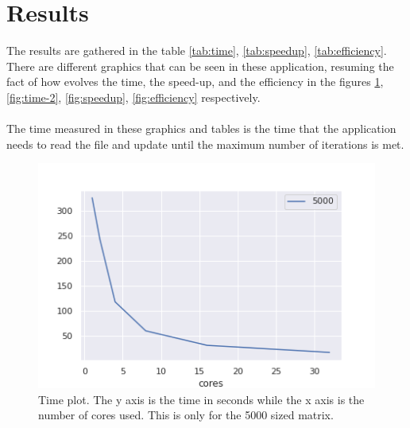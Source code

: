 \documentclass[11pt, a4paper]{article}
\begin{document}
	\section{Results}
		The results are gathered in the table \ref{tab:time}, \ref{tab:speedup}, \ref{tab:efficiency}. There are different graphics that can be seen in these application,  resuming the fact of how evolves the time, the speed-up, and the efficiency in the figures \ref{fig:time-1}, \ref{fig:time-2}, \ref{fig:speedup}, \ref{fig:efficiency} respectively.\\
	\\
	The time measured in these graphics and tables is the time that the application needs to read the file and update until the maximum number of iterations is met.
	\newcommand{\speedup}{
	\caption[Speedup]{Speedup table. There are two examples used in this process, both being square matrixes of 5000 and 10000 specifically.}
	\label{tab:speedup}
	
}
	\newcommand{\timetable}{
\caption[Time]{Time table. There are two examples used in this process, both being square matrixes of 5000 and 10000 specifically.}
\label{tab:time}
	
}
\newcommand{\efficiency}{
	\caption[Efficiency]{Efficiency table. There are two examples used in this process, both being square matrixes of 5000 and 10000 specifically.}
\label{tab:efficiency}
}
	
	
	
	
	
	\begin{figure}[H]
		\centering
		\includegraphics[width=0.7\linewidth]{plots/time-1}
		\caption[Time Plot]{Time plot. The y axis is the time in seconds while the x axis is the number of cores used. This is only for the 5000 sized matrix.}
		\label{fig:time-1}
	\end{figure}
	
\end{document}
